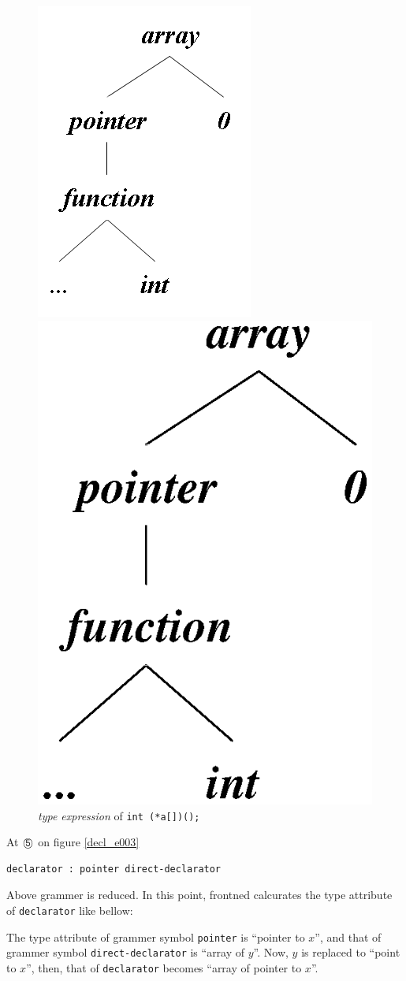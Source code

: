 \begin{figure}[htbp]
\begin{center}
\begin{htmlonly}
\includegraphics[width=0.5\linewidth,height=0.6\linewidth]{decl004.png}
\end{htmlonly} 
\begin{latexonly}
\includegraphics[width=0.5\linewidth,height=0.6\linewidth]{decl004.eps}
\end{latexonly}
\caption{{\em type expression} of {\tt{int (*a[])();}}}
\label{decl_e004}
\end{center}
\end{figure}

At ${\MARU{\tt 5}}$ on figure \ref{decl_e003}
\begin{verbatim}
declarator : pointer direct-declarator
\end{verbatim}
Above grammer is reduced. In this point, frontned calcurates
the type attribute of {\tt{declarator}} like bellow:

The type attribute of grammer symbol {\tt{pointer}} 
is ``pointer to $x$'', and that of grammer symbol
{\tt{direct-declarator}} is ``array of $y$''.
Now, $y$ is replaced to ``point to $x$'',
then, that of {\tt{declarator}} becomes
``array of pointer to $x$''.

